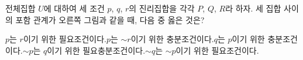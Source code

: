 \noindent\begin{minipage}[t]{0.58\linewidth}\vspace{0pt}\raggedright 전체집합 $U$에 대하여 세 조건 $p$, $q$, $r$의 진리집합을 각각 $P$, $Q$, $R$라 하자. 세 집합 사이의 포함 관계가 오른쪽 그림과 같을 때, 다음 중 옳은 것은?\end{minipage}\hfill\begin{minipage}[t]{0.4\linewidth}\vspace{0pt}\centering \resizebox{\ifdim\width>\linewidth\linewidth\else\width\fi}{!}{}\end{minipage}\par
\begin{choicesv}{$p$는 $r$이기 위한 필요조건이다.}{$p$는 ${\sim}r$이기 위한 충분조건이다.}{$q$는 $p$이기 위한 충분조건이다.}{${\sim}p$는 $q$이기 위한 필요충분조건이다.}{${\sim}q$는 ${\sim}p$이기 위한 필요조건이다.}\end{choicesv}
